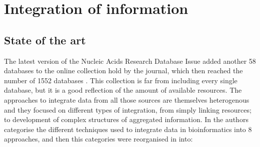 \section{Integration of information}
\subsection{State of the art}
The latest version of the Nucleic Acids Research Database Issue added another 58 databases to the online collection hold by the journal, which then reached the number of 1552 databases \cite{FER2014}. This collection is far from including every single database, but it is  a good reflection of the amount of available resources.
The approaches to integrate data from all those sources are themselves heterogenous and they focused on different types of integration, from simply linking resources; to development of complex structures of aggregated information. In \cite{GOB2008} the authors categorise the different techniques used to integrate data in bioinformatics into 8 approaches, and then this categories were reorganised in \cite{ZHA2011b} into:
